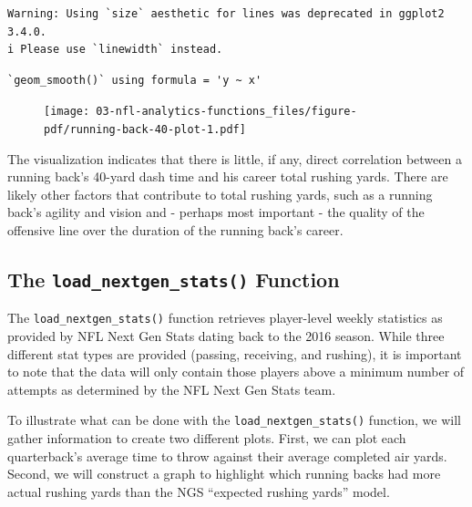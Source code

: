 \documentclass[
  letterpaper,
]{krantz}
\begin{document}
\begin{verbatim}
Warning: Using `size` aesthetic for lines was deprecated in ggplot2 3.4.0.
i Please use `linewidth` instead.
\end{verbatim}

\begin{verbatim}
`geom_smooth()` using formula = 'y ~ x'
\end{verbatim}

\begin{figure}[H]

{\centering \texttt{[image: 03-nfl-analytics-functions\_files/figure-pdf/running-back-40-plot-1.pdf]}

}

\end{figure}

The visualization indicates that there is little, if any, direct
correlation between a running back's 40-yard dash time and his career
total rushing yards. There are likely other factors that contribute to
total rushing yards, such as a running back's agility and vision and -
perhaps most important - the quality of the offensive line over the
duration of the running back's career.

\hypertarget{the-load_nextgen_stats-function}{%
\subsection{\texorpdfstring{The \texttt{load\_nextgen\_stats()}
Function}{The load\_nextgen\_stats() Function}}\label{the-load_nextgen_stats-function}}

The \texttt{load\_nextgen\_stats()} function retrieves player-level
weekly statistics as provided by NFL Next Gen Stats dating back to the
2016 season. While three different stat types are provided (passing,
receiving, and rushing), it is important to note that the data will only
contain those players above a minimum number of attempts as determined
by the NFL Next Gen Stats team.

To illustrate what can be done with the \texttt{load\_nextgen\_stats()}
function, we will gather information to create two different plots.
First, we can plot each quarterback's average time to throw against
their average completed air yards. Second, we will construct a graph to
highlight which running backs had more actual rushing yards than the NGS
``expected rushing yards'' model.
\end{document}
